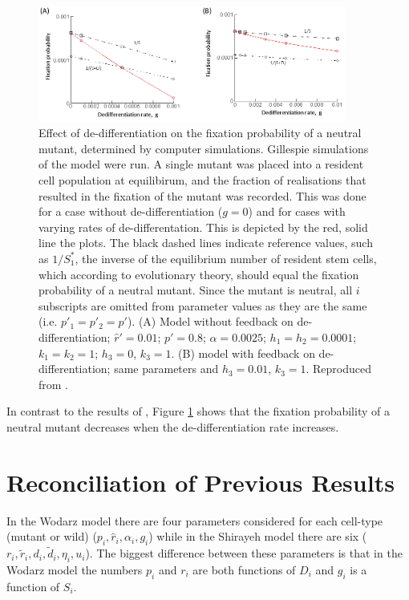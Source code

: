 \documentclass[12pt]{article}
\begin{document}
\begin{figure}[H]
\begin{center}
\includegraphics[width=0.9\textwidth]{wodarz.png}
\end{center}
\caption{Effect of de-differentiation on the fixation probability of a neutral mutant, determined by computer simulations. Gillespie simulations of the model were run. A single mutant was placed into a resident cell population at equilibirum, and the fraction of realisations that resulted in the fixation of the mutant was recorded. This was done for a case without de-differentiation ($g=0$) and for cases with varying rates of de-differentation. This is depicted by the red, solid line the plots. The black dashed lines indicate reference values, such as $1/S_1^\ast$, the inverse of the equilibrium number of resident stem cells, which according to evolutionary theory, should equal the fixation probability of a neutral mutant. Since the mutant is neutral, all $i$ subscripts are omitted from parameter values as they are the same (i.e. $p'_1=p'_2=p'$). (A) Model without feedback on de-differentiation; $\hat{r}'=0.01$; $p'=0.8$; $\alpha=0.0025$; $h_1=h_2=0.0001$; $k_1=k_2=1$; $h_3=0$, $k_3=1$. (B) model with feedback on de-differentiation; same parameters and $h_3=0.01$, $k_3=1$. Reproduced from \cite{wodarz}.}\label{wodarzResults}
\end{figure}

In contrast to the results of \cite{mohammad}, Figure \ref{wodarzResults} shows that the fixation probability of a neutral mutant decreases when the de-differentiation rate increases.

\section{Reconciliation of Previous Results}\label{recon}

In the Wodarz model there are four parameters considered for each cell-type (mutant or wild) ($p_i, \hat{r}_i, \alpha_i, g_i$) while in the Shirayeh model there are six ($r_i,\tilde{r}_i, d_i, \tilde{d}_i, \eta_i, u_i$). The biggest difference between these parameters is that in the Wodarz model the numbers $p_i$ and $r_i$ are both functions of $D_i$ and $g_i$ is a function of $S_i$.
\end{document}
